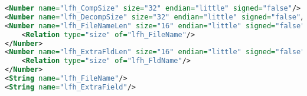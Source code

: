 
\begin{minipage}{15cm}
\begin{lstlisting}[language=XML, caption=Portion of a Peach data model., label=peach, mathescape=true]
<Number name="lfh_CompSize" size="32" endian="little" signed="false"/>
<Number name="lfh_DecompSize" size="32" endian="little" signed="false"/>
<Number name="lfh_FileNameLen" size="16" endian="little" signed="false">
    <Relation type="size" of="lfh_FileName"/>
</Number>
<Number name="lfh_ExtraFldLen" size="16" endian="little" signed="false">
    <Relation type="size" of="lfh_FldName"/>
</Number>
<String name="lfh_FileName"/>
<String name="lfh_ExtraField"/>
\end{lstlisting}
\end{minipage}

